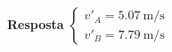 
\textbf{Resposta}
$
\begin{cases}
	v'_{A}=\SI{5.07}{\meter/\second}\\
	v'_{B}=\SI{7.79}{\meter/\second}
\end{cases}
$